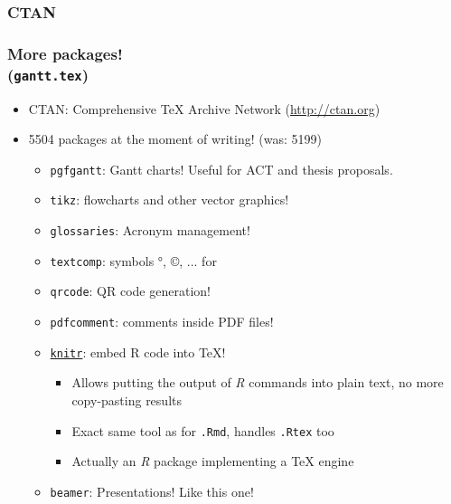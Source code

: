 \documentclass[xetex,colorlinks]{beamer} %
\begin{document}
  \subsubsection{CTAN}
  \begin{frame}
    \frametitle{More packages! \\ (\texttt{gantt.tex})}
    \begin{itemize}
     \item CTAN: Comprehensive \TeX{} Archive Network (\href{http://ctan.org}{http://ctan.org})
     \item 5504 packages at the moment of writing! (was: 5199)
      \begin{itemize}
      \item \texttt{pgfgantt}: Gantt charts! Useful for ACT and thesis proposals.
      \item \texttt{tikz}: flowcharts and other vector graphics!
      \item \texttt{glossaries}: Acronym management!
      \item \texttt{textcomp}: symbols °, ©, ... for 
      \item \texttt{qrcode}: QR code generation!
      \item \texttt{pdfcomment}: comments inside PDF files!
      \item \href{https://github.com/yihui/knitr-examples/blob/master/005-latex.Rtex}{\texttt{knitr}}: embed R code into \TeX{}!
      \begin{itemize}
	\item Allows putting the output of \textit{R} commands into plain text, no more copy-pasting results
	\item Exact same tool as for \texttt{.Rmd}, handles \texttt{.Rtex} too
	\item Actually an \textit{R} package implementing a \TeX{} engine
      \end{itemize}
      \item \texttt{beamer}: Presentations! Like this one!
      \end{itemize}
    \end{itemize}
  \end{frame}
\end{document}

